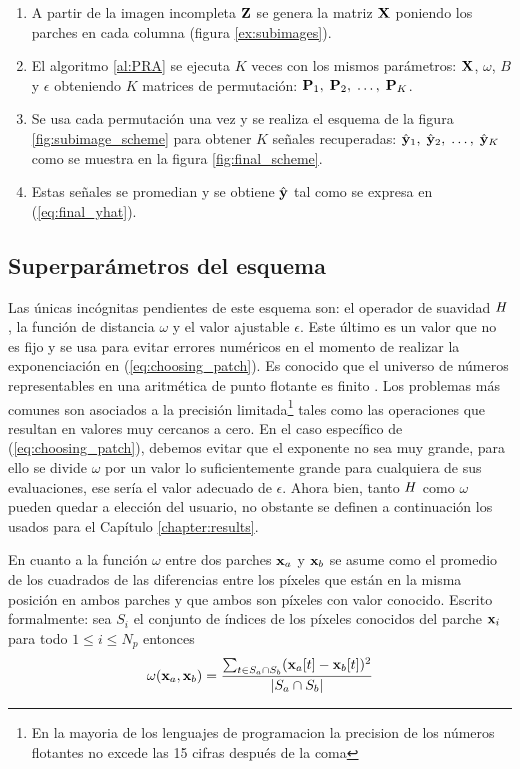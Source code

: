 \begin{enumerate}
	\item A partir de la imagen incompleta $\Z$ se genera la matriz $\X$ poniendo los parches en cada columna (figura \ref{ex:subimages}).
	\item El algoritmo \ref{al:PRA} se ejecuta $K$ veces con los mismos par\'ametros: $\X$, $\omega$, $B$ y $\epsilon$ obteniendo $K$ matrices de permutaci\'on: $\P_1,\; \P_2,\; \dots,\; \P_K$.
	\item Se usa cada permutaci\'on una vez y se realiza el esquema de la figura \ref{fig:subimage_scheme} para obtener $K$ señales recuperadas: $\yhat_1,\; \yhat_2,\; \dots,\; \yhat_K$ como se muestra en la figura \ref{fig:final_scheme}.
	\item Estas señales se promedian y se obtiene $\yhat$ tal como se expresa en (\ref{eq:final_yhat}).
\end{enumerate}

\subsection{Superpar\'ametros del esquema}
Las \'unicas incógnitas pendientes de este esquema son: el operador de suavidad $\H$, la funci\'on de distancia $\omega$ y el valor ajustable $\epsilon$. Este \'ultimo es un valor que no es fijo y se usa para evitar errores num\'ericos en el momento de realizar la exponenciaci\'on en (\ref{eq:choosing_patch}). Es conocido que el universo de números representables en una aritmética de punto flotante es finito \cite{conte2017elementary}. Los problemas m\'as comunes son asociados a la precisión limitada\footnote{En la mayoria de los lenguajes de programacion la precision de los n\'umeros flotantes no excede las 15 cifras despu\'es de la coma} tales como las operaciones que resultan en valores muy cercanos a cero. En el caso espec\'ifico de (\ref{eq:choosing_patch}), debemos evitar que el exponente no sea muy grande, para ello se divide $\omega$ por un valor lo suficientemente grande para cualquiera de sus evaluaciones, ese ser\'ia el valor adecuado de $\epsilon$. Ahora bien, tanto $\H$ como $\omega$ pueden quedar a elecci\'on del usuario, no obstante se definen a continuaci\'on los usados para el Cap\'itulo \ref{chapter:results}.

En cuanto a la funci\'on $\omega$ entre dos parches $\x_a$ y $\x_b$ se asume como el promedio de los cuadrados de las diferencias entre los p\'ixeles que est\'an en la misma posici\'on en ambos parches y que ambos son p\'ixeles con valor conocido. Escrito formalmente: sea $S_i$ el conjunto de \'indices de los p\'ixeles conocidos del parche $\x_i$ para todo $1 \le i \le N_p$ entonces
\begin{equation}
\omega(\x_a, \x_b) = \frac{\sum_{t \in S_a \cap S_b} (\x_a[t] - \x_b[t])^2}{|S_a \cap S_b|}
\end{equation}

